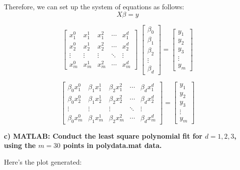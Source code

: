 \documentclass[paper=a4, fontsize=11pt]{scrartcl} %
\numberwithin{equation}{section} %
\numberwithin{figure}{section} %
\numberwithin{table}{section} %
\begin{document}
Therefore, we can set up the system of equations as follows: 
$$
X\beta = y 
$$ 

$$
\begin{bmatrix}
x_1^{0} & x_1^{1} & x_1^{2} & \cdots & x_1^{d} \\
x_2^{0} & x_2^{1} & x_2^{2} & \cdots & x_2^{d} \\
\vdots  & \vdots  & \vdots  & \ddots & \vdots \\
x_m^{0} & x_m^{1} & x_m^{2} & \cdots & x_m^{d} 
\end{bmatrix}
\;
\begin{bmatrix}
\beta_0 \\ 
\beta_1 \\ 
\beta_2 \\ 
\vdots  \\
\beta_d 
\end{bmatrix}
= 
\begin{bmatrix}
y_1 \\
y_2 \\
y_3 \\
\vdots \\ 
y_m 
\end{bmatrix}
$$

$$
\begin{bmatrix}
\beta_0 x_1^{0} & \beta_1 x_1^{1} & \beta_2 x_1^{2} & \cdots & \beta_d x_1^{d} \\
\beta_0 x_2^{0} & \beta_1 x_2^{1} & \beta_2 x_2^{2} & \cdots & \beta_d x_2^{d} \\
\vdots  & \vdots  & \vdots  & \ddots & \vdots \\
\beta_0 x_m^{0} & \beta_1 x_m^{1} & \beta_2 x_m^{2} & \cdots & \beta_d x_m^{d} 
\end{bmatrix}
=
\begin{bmatrix}
y_1 \\
y_2 \\
y_3 \\
\vdots \\ 
y_m 
\end{bmatrix}
$$

\newpage
\textbf{c) MATLAB: Conduct the least square polynomial fit for $d = 1,2,3$, using the $m=30$ points in polydata.mat data.}  

Here's the plot generated: 
\end{document}
